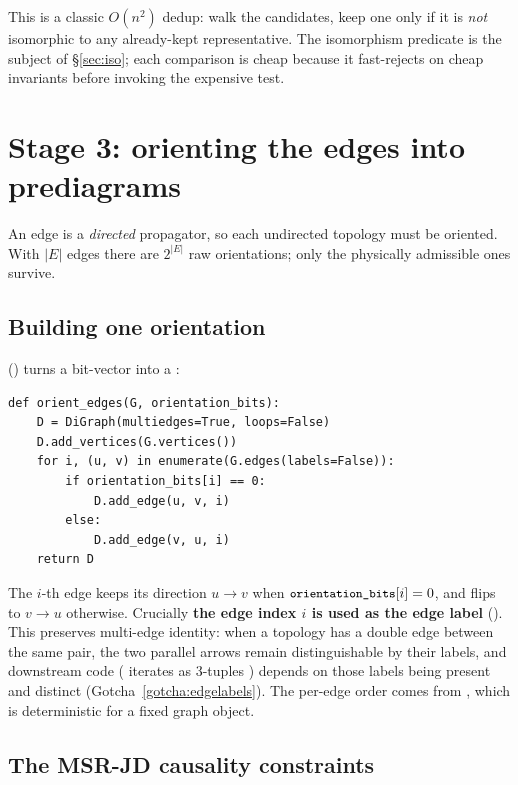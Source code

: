 This is a classic $O(n^2)$ dedup: walk the candidates, keep one only if it is
\emph{not} isomorphic to any already-kept representative. The isomorphism
predicate  is the subject of
\S\ref{sec:iso}; each comparison is cheap because it fast-rejects on cheap
invariants before invoking the expensive test.

\section{Stage 3: orienting the edges into prediagrams}

An \msrjd{} edge is a \emph{directed} propagator, so each undirected topology must
be oriented. With $|E|$ edges there are $2^{|E|}$ raw orientations; only the
physically admissible ones survive.

\subsection{Building one orientation}

() turns a bit-vector into a
:

\begin{lstlisting}
def orient_edges(G, orientation_bits):
    D = DiGraph(multiedges=True, loops=False)
    D.add_vertices(G.vertices())
    for i, (u, v) in enumerate(G.edges(labels=False)):
        if orientation_bits[i] == 0:
            D.add_edge(u, v, i)
        else:
            D.add_edge(v, u, i)
    return D
\end{lstlisting}

The $i$-th edge keeps its direction $u\to v$ when $\texttt{\small orientation\_bits}[i]=0$,
and flips to $v\to u$ otherwise. Crucially \textbf{the edge index $i$ is used as
the edge label} (). This preserves multi-edge identity:
when a topology has a double edge between the same pair, the two parallel arrows
remain distinguishable by their labels, and downstream code
( iterates  as 3-tuples ) depends on those labels being present and distinct
(Gotcha~\ref{gotcha:edgelabels}). The per-edge order comes from
, which is deterministic for a fixed graph object.

\subsection{The MSR-JD causality constraints}


